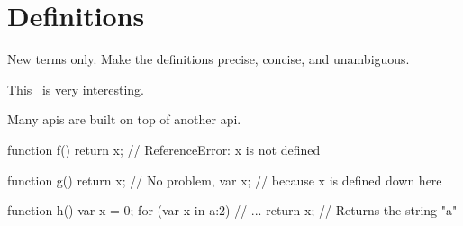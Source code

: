 \chapter{Definitions}
\thispagestyle{fancy}
\label{c:definitions}

New terms only. Make the definitions precise, concise, and unambiguous.

This~\cite{Lincke2012} is very interesting.

Many \acp{api} are built on top of another \ac{api}.

\begin{javascript}[float=htbp,caption=Scoping in JavaScript,label=l:jsscoping]
function f() {
  return x;   // ReferenceError: x is not defined
}

function g() {
  return x;   // No problem,
  var x;      // because x is defined down here
}

function h() {
  var x = 0;
  for (var x in {a:2}) {
    // ...
  }
  return x;   // Returns the string "a"
}
\end{javascript}

%

%
%
